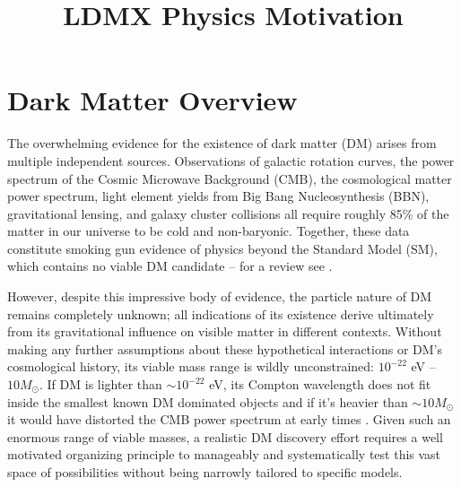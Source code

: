 \documentclass{article}
\begin{document}
\newcommand{\be}{\begin{eqnarray}}
\newcommand{\ee}{\end{eqnarray}}
\newcommand{\Gev}{\,\,\mathrm{GeV}}
\newcommand{\SUWeak}{\mathrm{SU}(2)_{\rm W}}
\newcommand{\Lag}{\mathcal{L}}
\newcommand{\Lagtree}{\mathcal{L}_{\rm tree}}
\newcommand{\benum}{\begin{enumerate}}
\newcommand{\eenum}{\end{enumerate}}
\newcommand{\bi}{\begin{itemize}}
\newcommand{\ei}{\end{itemize}}
\newcommand{\met}{\slashed{E_T}}
\newcommand{\ap}{{A^\prime}}


\title{LDMX Physics Motivation}
\maketitle
\section{Dark Matter Overview}
The overwhelming evidence for the existence of dark matter (DM) arises from multiple independent sources. 
 Observations of galactic rotation curves, the power spectrum of the Cosmic Microwave Background (CMB), 
the cosmological matter power spectrum, light element yields from Big Bang Nucleosynthesis (BBN), gravitational
lensing, and galaxy cluster collisions all require roughly 85\% of the matter in our universe to be cold and non-baryonic. 
Together, these data constitute smoking gun evidence  of physics beyond the Standard Model (SM), which contains
no viable DM candidate -- for a review see \cite{Bertone:2004pz}.

However, despite this impressive body of evidence, the particle nature of DM remains completely unknown; all indications of 
its existence derive ultimately from its gravitational influence on visible matter in different contexts. 
Without making any further assumptions about these hypothetical interactions or DM's cosmological history,
 its viable mass range is wildly unconstrained: $10^{-22} $ eV -- $10 M_{\odot}$.  If DM is lighter than $\sim 10^{-22}$ eV, 
 its Compton wavelength does not fit inside the smallest known DM dominated objects \cite{Navarro:1995iw} and if it's heavier than $\sim 10 M_{\odot}$ 
 it would have distorted the CMB power spectrum at early times \cite{Bird:2016dcv}. Given such an enormous range of viable masses, a realistic DM discovery effort requires a well motivated organizing principle to manageably and systematically test this vast space of possibilities without being narrowly tailored
 to specific models.
\end{document}
